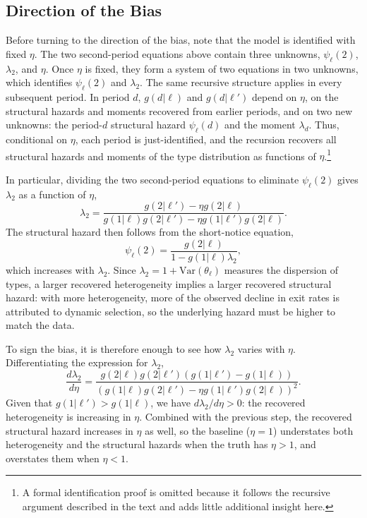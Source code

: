 \documentclass{div}
\begin{document}
\subsection{Direction of the Bias}

Before turning to the direction of the bias, note that the model is identified with fixed $\eta$. The two second-period equations above contain three unknowns, $\psi_\ell(2)$, $\lambda_2$, and $\eta$. Once $\eta$ is fixed, they form a system of two equations in two unknowns, which identifies $\psi_\ell(2)$ and $\lambda_2$. The same recursive structure applies in every subsequent period. In period $d$, $g(d|\ell)$ and $g(d|\ell')$ depend on $\eta$, on the structural hazards and moments recovered from earlier periods, and on two new unknowns: the period-$d$ structural hazard $\psi_\ell(d)$ and the moment $\lambda_d$. Thus, conditional on $\eta$, each period is just-identified, and the recursion recovers all structural hazards and moments of the type distribution as functions of $\eta$.\footnote{A formal identification proof is omitted because it follows the recursive argument described in the text and adds little additional insight here.} 

In particular, dividing the two second-period equations to eliminate $\psi_\ell(2)$ gives $\lambda_2$ as a function of $\eta$,
\begin{equation*}
  \lambda_2 = \frac{g(2|\ell')-\eta g(2|\ell)}{g(1|\ell)g(2|\ell')-\eta g(1|\ell')g(2|\ell)}.
\end{equation*}
The structural hazard then follows from the short-notice equation,
\[
  \psi_\ell(2)=\frac{g(2|\ell)}{1-g(1|\ell)\lambda_2},
\]
which increases with $\lambda_2$. Since $\lambda_2=1+\mathrm{Var}(\theta_\ell)$ measures the dispersion of types, a larger recovered heterogeneity implies a larger recovered structural hazard: with more heterogeneity, more of the observed decline in exit rates is attributed to dynamic selection, so the underlying hazard must be higher to match the data.

To sign the bias, it is therefore enough to see how $\lambda_2$ varies with $\eta$. Differentiating the expression for $\lambda_2$,
\[
  \frac{d\lambda_2}{d\eta}=\frac{g(2|\ell)g(2|\ell')(g(1|\ell')-g(1|\ell))}{(g(1|\ell)g(2|\ell')-\eta g(1|\ell')g(2|\ell))^2}.
\]
Given that $g(1|\ell')>g(1|\ell)$, we have $d\lambda_2/d\eta>0$: the recovered heterogeneity is increasing in $\eta$. Combined with the previous step, the recovered structural hazard increases in $\eta$ as well, so the baseline ($\eta=1$) understates both heterogeneity and the structural hazards when the truth has $\eta>1$, and overstates them when $\eta<1$. 
\end{document}
